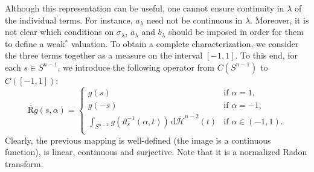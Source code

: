 \documentclass[11pt, a4paper]{amsart}
\renewcommand{\d}{\,\mathrm{d}}
\newcommand{\sn}{{S^{n-1}}}
\newcommand{\sm}{S^{n-2}}
\renewcommand{\d}{\,\mathrm{d}}
\newcommand{\radon}{\operatorname{\overline R}}
\begin{document}
Although this representation can be useful, one cannot ensure continuity in $\lambda$ of the individual terms. For instance, $a_\lambda$ need not be continuous in $\lambda$. Moreover, it is not clear which conditions on $\sigma_\lambda$, $a_\lambda$ and $b_\lambda$ should be imposed in order for them to define a weak$^*$ valuation. To obtain a complete characterization, we consider the three terms together as a measure on the interval $[-1,1]$. To this end, for each $s\in\sn$, we introduce the following operator from $C(\sn)$ to $C([-1,1])$:
\[
    \radon g(s,\alpha)=\left\{\begin{array}{ll}
        g(s) &\text{if }\alpha=1, \\
        g(-s) &\text{if }\alpha=-1, \\
        \displaystyle\int_{\sm}g(\vartheta_s^{-1}(\alpha,t))\d\overline{\mathcal{H}}^{n-2}(t) &\text{if }\alpha\in(-1,1). \\
    \end{array} \right.
\]
Clearly, the previous mapping is well-defined (the image is a continuous function), is linear, continuous and surjective. Note that it is a normalized Radon transform.
\end{document}
